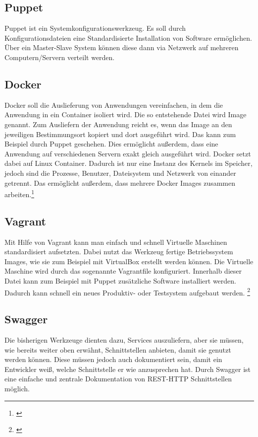 \subsection{Puppet}
\label{subsec:puppet}
Puppet ist ein Systemkonfigurationswerkzeug. Es soll durch Konfigurationsdateien eine Standardisierte Installation von Software ermöglichen. Über ein Master-Slave System können diese dann via Netzwerk auf mehreren Computern/Servern verteilt werden.

\subsection{Docker}
\label{subsec:docker}
Docker soll die Auslieferung von Anwendungen vereinfachen, in dem die Anwendung in ein Container isoliert wird. Die so entstehende Datei wird Image genannt. Zum Ausliefern der Anwendung reicht es, wenn das Image an den jeweiligen Bestimmungsort kopiert und dort ausgeführt wird. Das kann zum Beispiel durch Puppet geschehen. Dies ermöglicht außerdem, dass eine Anwendung auf verschiedenen Servern exakt gleich ausgeführt wird.
Docker setzt dabei auf Linux Container. Dadurch ist nur eine Instanz des Kernels im Speicher, jedoch sind die Prozesse, Benutzer, Dateisystem und Netzwerk von einander getrennt. Das ermöglicht außerdem, dass mehrere Docker Images zusammen arbeiten.\footnote{\cite[vgl. S. 53 ff.]{EWolff2015:ContinuouosDelivery}}

\subsection{Vagrant}
\label{subesec:vagrant}
Mit Hilfe von Vagrant kann man einfach und schnell Virtuelle Maschinen standardisiert aufsetzten. Dabei nutzt das Werkzeug fertige Betriebssystem Images, wie sie zum Beispiel mit VirtualBox erstellt werden können. Die Virtuelle Maschine wird durch das sogenannte Vagrantfile konfiguriert. Innerhalb dieser Datei kann zum Beispiel mit Puppet zusätzliche Software installiert werden. Dadurch kann schnell ein neues Produktiv- oder Testsystem aufgebaut werden.
\footnote{\cite[vgl. S. 49 ff.]{EWolff2015:ContinuouosDelivery}}

\subsection{Swagger}
\label{subsec:swagger}
Die bisherigen Werkzeuge dienten dazu, Services auszuliefern, aber sie müssen, wie bereits weiter oben erwähnt, Schnittstellen anbieten, damit sie genutzt werden können. Diese müssen jedoch auch dokumentiert sein, damit ein Entwickler weiß, welche Schnittstelle er wie anzusprechen hat. Durch Swagger ist eine einfache und zentrale Dokumentation von REST-HTTP Schnittstellen möglich.

